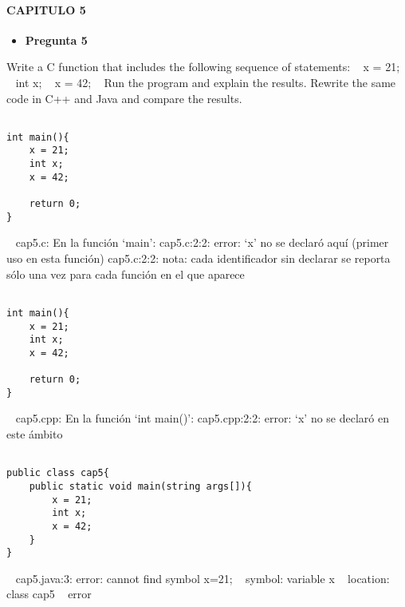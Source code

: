 \documentclass[../main.tex]{subfiles}
\begin{document}
\paragraph{\textbf{CAPITULO 5}}
\begin{itemize}
	\item \textbf{Pregunta 5}
\end{itemize}
	Write a C function that includes the following sequence of statements:
~\newline
	x = 21;
~\newline
	int x;
~\newline
	x = 42;
~\newline
	Run the program and explain the results. Rewrite the same code in C++
	and Java and compare the results.

\begin{lstlisting}[belowcaptionskip=.5em,caption={C\'odigo en lenguaje C.}]
	
int main(){
	x = 21;
	int x;
	x = 42;
	
	return 0;
}
\end{lstlisting}
~\newline
cap5.c: En la función ‘main’:\newline
cap5.c:2:2: error: ‘x’ no se declaró aquí (primer uso en esta función)\newline
cap5.c:2:2: nota: cada identificador sin declarar se reporta sólo una vez para cada función en el que aparece\newline

\begin{lstlisting}[belowcaptionskip=.5em,caption={C\'odigo en lenguaje C++.}]
	
int main(){
	x = 21;
	int x;
	x = 42;
	
	return 0;
}
\end{lstlisting}
~\newline
cap5.cpp: En la función ‘int main()’:\newline
cap5.cpp:2:2: error: ‘x’ no se declaró en este ámbito\newline

\begin{lstlisting}[belowcaptionskip=.5em,caption={C\'odigo en lenguaje Java.}]
	
public class cap5{
	public static void main(string args[]){
		x = 21;
		int x;
		x = 42;
	}
}
\end{lstlisting}
~\newline
cap5.java:3: error: cannot find symbol x=21;
~\newline
  symbol:   variable x
~\newline
  location: class cap5
~ error
\end{document}
